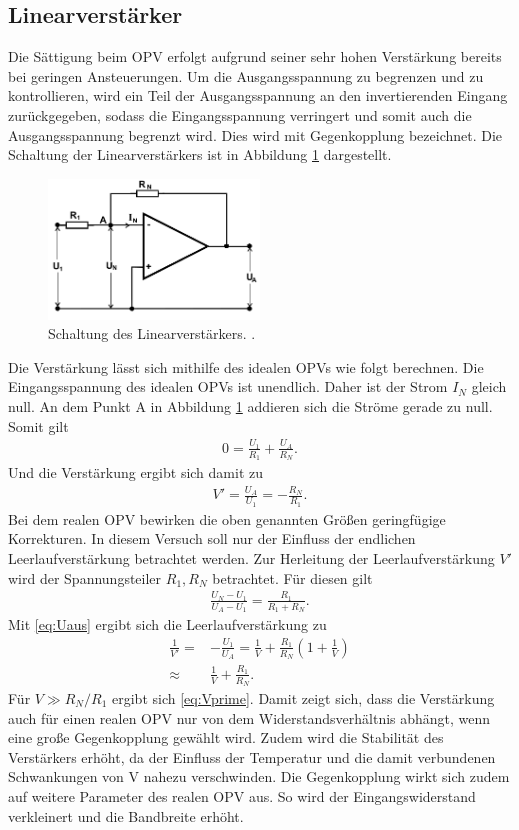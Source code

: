  \subsection{Linearverstärker}
 Die Sättigung beim OPV erfolgt aufgrund seiner sehr hohen Verstärkung bereits bei geringen Ansteuerungen. 
 Um die Ausgangsspannung 
 zu begrenzen und zu kontrollieren,
wird ein Teil der Ausgangsspannung an den invertierenden Eingang zurückgegeben, sodass
die Eingangsspannung verringert und somit
auch die Ausgangsspannung begrenzt wird.
Dies wird mit Gegenkopplung bezeichnet. Die
Schaltung der Linearverstärkers ist in Abbildung \ref{pic:linear}
dargestellt. 
\begin{figure}[t]
 \includegraphics[width = 0.5\textwidth]{../pics/Linear.png}
 \caption{Schaltung des Linearverstärkers. \cite{Anl}.}
 \label{pic:linear}
\end{figure}
Die Verstärkung lässt sich mithilfe
des idealen OPVs wie folgt berechnen. Die Eingangsspannung des idealen OPVs ist
unendlich. Daher ist der Strom $I_N$ gleich null. An dem Punkt A in Abbildung \ref{pic:linear}
addieren sich die Ströme gerade zu null. Somit gilt
\begin{align}
 0 = \frac{U_1}{R_1} + \frac{U_A}{R_N}.
\end{align}
Und die Verstärkung ergibt sich damit zu
\begin{align}
 V' = \frac{U_A}{U_1} = -\frac{R_N}{R_1}.
 \label{eq:Vprime}
\end{align}
Bei dem realen OPV bewirken die oben genannten Größen geringfügige Korrekturen.
In diesem Versuch soll nur der Einfluss der endlichen Leerlaufverstärkung betrachtet werden.
Zur Herleitung der Leerlaufverstärkung $V'$ wird der Spannungsteiler $R_1,R_N$ betrachtet.
Für diesen gilt
\begin{align}
 \frac{U_N-U_1}{U_A-U_1} = \frac{R_1}{R_1+R_N}.
\end{align}
Mit \eqref{eq:Uaus} ergibt sich die Leerlaufverstärkung zu
\begin{align}
 \frac{1}{V'} =& -\frac{U_1}{U_A} = \frac{1}{V} + \frac{R_1}{R_N}\left(1+\frac{1}{V}\right) \\
 \approx& \frac{1}{V} + \frac{R_1}{R_N}.
 \label{eq:leerlauf}
\end{align}
Für $V\gg R_N/R_1$ ergibt sich \eqref{eq:Vprime}. 
Damit zeigt sich, dass die Verstärkung 
auch für einen realen OPV nur von
dem Widerstandsverhältnis abhängt, wenn eine 
große Gegenkopplung gewählt wird. Zudem 
wird die Stabilität des Verstärkers erhöht,
da der Einfluss der Temperatur und die damit 
verbundenen Schwankungen von V nahezu
verschwinden. Die Gegenkopplung wirkt sich
zudem auf weitere Parameter des realen OPV
aus. So wird der Eingangswiderstand verkleinert 
und die Bandbreite erhöht.

